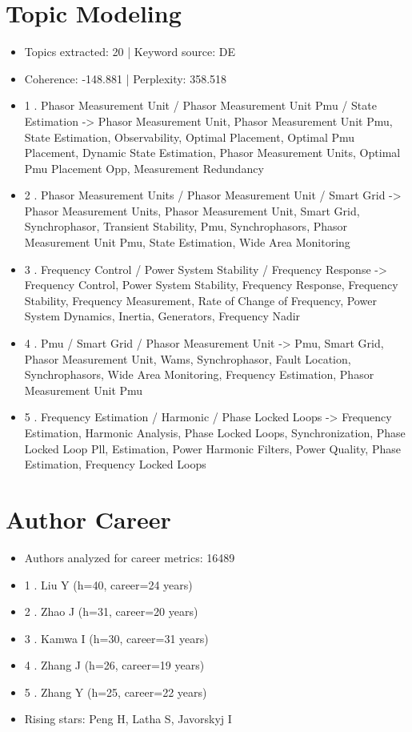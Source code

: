 \documentclass[12pt]{article}
\begin{document}
\section*{Topic Modeling}
\begin{itemize}
\item Topics extracted: 20 | Keyword source: DE
\item Coherence: -148.881 | Perplexity: 358.518
\item 1 . Phasor Measurement Unit / Phasor Measurement Unit Pmu / State Estimation -> Phasor Measurement Unit, Phasor Measurement Unit Pmu, State Estimation, Observability, Optimal Placement, Optimal Pmu Placement, Dynamic State Estimation, Phasor Measurement Units, Optimal Pmu Placement Opp, Measurement Redundancy
\item 2 . Phasor Measurement Units / Phasor Measurement Unit / Smart Grid -> Phasor Measurement Units, Phasor Measurement Unit, Smart Grid, Synchrophasor, Transient Stability, Pmu, Synchrophasors, Phasor Measurement Unit Pmu, State Estimation, Wide Area Monitoring
\item 3 . Frequency Control / Power System Stability / Frequency Response -> Frequency Control, Power System Stability, Frequency Response, Frequency Stability, Frequency Measurement, Rate of Change of Frequency, Power System Dynamics, Inertia, Generators, Frequency Nadir
\item 4 . Pmu / Smart Grid / Phasor Measurement Unit -> Pmu, Smart Grid, Phasor Measurement Unit, Wams, Synchrophasor, Fault Location, Synchrophasors, Wide Area Monitoring, Frequency Estimation, Phasor Measurement Unit Pmu
\item 5 . Frequency Estimation / Harmonic / Phase Locked Loops -> Frequency Estimation, Harmonic Analysis, Phase Locked Loops, Synchronization, Phase Locked Loop Pll, Estimation, Power Harmonic Filters, Power Quality, Phase Estimation, Frequency Locked Loops
\end{itemize}
\section*{Author Career}
\begin{itemize}
\item Authors analyzed for career metrics: 16489
\item 1 . Liu Y (h=40, career=24 years)
\item 2 . Zhao J (h=31, career=20 years)
\item 3 . Kamwa I (h=30, career=31 years)
\item 4 . Zhang J (h=26, career=19 years)
\item 5 . Zhang Y (h=25, career=22 years)
\item Rising stars: Peng H, Latha S, Javorskyj I
\end{itemize}
\end{document}
